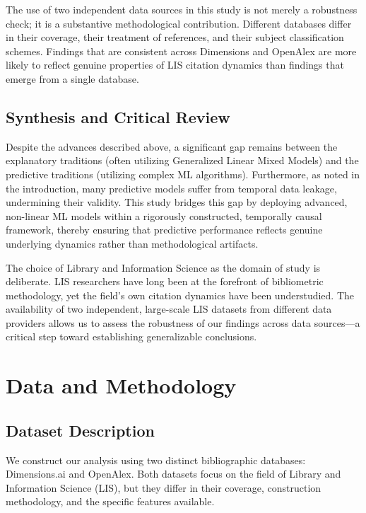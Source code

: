 \documentclass[12pt,a4paper]{article}
\begin{document}
The use of two independent data sources in this study is not merely a robustness check; it is a substantive methodological contribution. Different databases differ in their coverage, their treatment of references, and their subject classification schemes. Findings that are consistent across Dimensions and OpenAlex are more likely to reflect genuine properties of LIS citation dynamics than findings that emerge from a single database.

\subsection{Synthesis and Critical Review}

Despite the advances described above, a significant gap remains between the explanatory traditions (often utilizing Generalized Linear Mixed Models) and the predictive traditions (utilizing complex ML algorithms). Furthermore, as noted in the introduction, many predictive models suffer from temporal data leakage, undermining their validity. This study bridges this gap by deploying advanced, non-linear ML models within a rigorously constructed, temporally causal framework, thereby ensuring that predictive performance reflects genuine underlying dynamics rather than methodological artifacts.

The choice of Library and Information Science as the domain of study is deliberate. LIS researchers have long been at the forefront of bibliometric methodology, yet the field's own citation dynamics have been understudied. The availability of two independent, large-scale LIS datasets from different data providers allows us to assess the robustness of our findings across data sources---a critical step toward establishing generalizable conclusions.

\section{Data and Methodology}
\label{sec:data}

\subsection{Dataset Description}

We construct our analysis using two distinct bibliographic databases: Dimensions.ai and OpenAlex. Both datasets focus on the field of Library and Information Science (LIS), but they differ in their coverage, construction methodology, and the specific features available.
\end{document}

